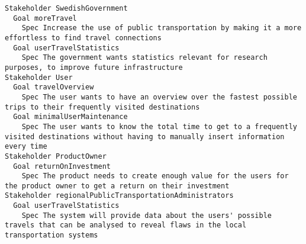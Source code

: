

\begin{lstlisting}
Stakeholder SwedishGovernment
  Goal moreTravel
    Spec Increase the use of public transportation by making it a more effortless to find travel connections
  Goal userTravelStatistics
    Spec The government wants statistics relevant for research purposes, to improve future infrastructure
Stakeholder User
  Goal travelOverview
    Spec The user wants to have an overview over the fastest possible trips to their frequently visited destinations
  Goal minimalUserMaintenance
    Spec The user wants to know the total time to get to a frequently visited destinations without having to manually insert information every time
Stakeholder ProductOwner
  Goal returnOnInvestment
    Spec The product needs to create enough value for the users for the product owner to get a return on their investment
Stakeholder regionalPublicTransportationAdministrators
  Goal userTravelStatistics
    Spec The system will provide data about the users' possible travels that can be analysed to reveal flaws in the local transportation systems

\end{lstlisting}